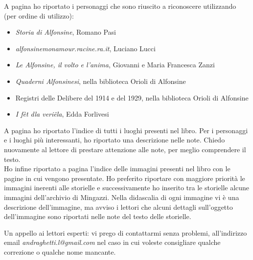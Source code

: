 \label{fonti}
\noindent A pagina \pageref{Personaggi} ho riportato i personaggi che sono riuscito a riconoscere utilizzando (per ordine di utilizzo):
\begin{itemize}\itemsep2pt
\item{\emph{Storia di Alfonsine}, Romano Pasi}
\item{\emph{alfonsinemonamour.racine.ra.it}, Luciano Lucci}
\item{\emph{Le Alfonsine, il volto e l'anima}, Giovanni e Maria Francesca Zanzi}
\item{\emph{Quaderni Alfonsinesi}, nella biblioteca Orioli di Alfonsine}
\item{Registri delle Delibere del 1914 e del 1929, nella biblioteca Orioli di Alfonsine}
\item{\emph{I fèt dla veriëla}, Edda Forlivesi}
\end{itemize}

A pagina \pageref{Luoghi} ho riportato l'indice di tutti i luoghi presenti nel libro. Per i personaggi e i luoghi più interessanti, ho riportato una descrizione nelle note. Chiedo nuovamente al lettore di prestare attenzione alle note, per meglio comprendere il testo.\\

Ho infine riportato a pagina \pageref{Immagini} l'indice delle immagini presenti nel libro con le pagine in cui vengono presentate. Ho preferito riportare con maggiore priorità le immagini inerenti alle storielle e successivamente ho inserito tra le storielle alcune immagini dell'archivio di Mingazzi. Nella didascalia di ogni immagine vi è una descrizione dell'immagine, ma avviso i lettori che alcuni dettagli sull'oggetto dell'immagine sono riportati nelle note del testo delle storielle.

\vspace{1cm}

Un appello ai lettori esperti: vi prego di contattarmi senza problemi, all'indirizzo email \textit{andraghetti.l@gmail.com} nel caso in cui voleste consigliare qualche correzione o qualche nome mancante.\\

